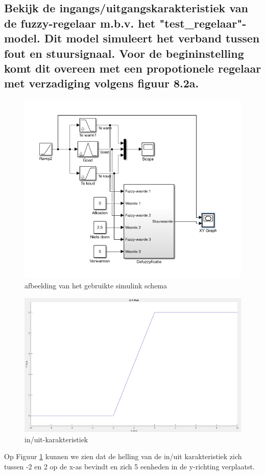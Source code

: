 \documentclass[a4paper, 12pt]{article}
\begin{document}
\subsection{Bekijk de ingangs/uitgangskarakteristiek van de fuzzy-regelaar m.b.v. het "test\_regelaar"-model. Dit model simuleert het verband tussen fout en stuursignaal. Voor de begininstelling komt dit overeen met een propotionele regelaar met verzadiging volgens figuur 8.2a.}


\begin{figure}[!h]
	\includegraphics[width=1\linewidth]{Labo4_1_test_regelaar_screen.jpg}
	\caption{afbeelding van het gebruikte simulink schema}
\end{figure}

\begin{figure}[!h]
	\includegraphics[width=1\linewidth]{Labo4_1_xy-plot.jpg}
	\caption{in/uit-karakteristiek}
	\label{fig:in/uit}
\end{figure}
\newpage
\noindent Op Figuur \ref{fig:in/uit} kunnen we zien dat de helling van de in/uit karakteristiek zich tussen -2 en 2 op de x-as bevindt en zich 5 eenheden in de y-richting verplaatst. \\
\end{document}
